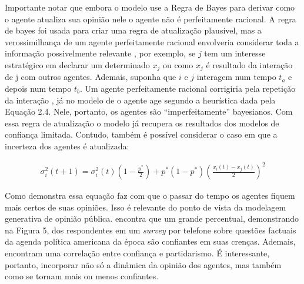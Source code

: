   Importante notar que embora o modelo use a Regra de Bayes para derivar como o
  agente atualiza sua opinião nele o agente não é perfeitamente racional. A
  regra de bayes foi usada para criar uma regra de atualização plausível, mas a
  verossimilhança de um agente perfeitamente racional envolveria considerar
  toda a informação possivelmente relevante
  , por exemplo, se \(j\) tem um interesse estratégico em declarar um
  determinado \(x_j\) ou como \(x_j\) é resultado da interação de j com outros
  agentes. Ademais, suponha que \(i\) e \(j\) interagem num tempo \(t_a\) e
  depois num tempo \(t_b\). Um agente perfeitamente racional corrigiria pela
  repetição da interação \cite{acemoglu2011opinion}, já no modelo de
   o agente age segundo a heurística dada pela
  Equação 2.4. Nele, portanto, os agentes são ``imperfeitamente'' bayesianos.
  Com essa regra de atualização o modelo já recupera os resultados dos modelos
  de confiança limitada. Contudo, também é possível considerar o caso em que a
  incerteza dos agentes é atualizada:

      \begin{align}
    \sigma_i^2(t+1)
    =
    \sigma_i^2(t)
    (1 - \frac{p^*}{2})
    +
    p^*
    (1-p^*)
    (\frac{x_i(t)-x_j(t)}{2})^2
      \end{align}

      Como demonstra  essa equação faz com que o
      passar do tempo os agentes fiquem mais certos de suas opiniões. Isso é
      relevante do ponto de vista da modelagem generativa de opinião pública.
       encontra que um grande
      percentual, demonstrando na Figura 5, dos respondentes em um
      \textit{survey} por telefone sobre questões factuais da agenda política
      americana da época são confiantes em suas crenças. Ademais, encontram uma
      correlação entre confiança e partidarismo. É interessante, portanto,
      incorporar não só a dinâmica da opinião dos agentes, mas também como
      se tornam mais ou menos confiantes.


